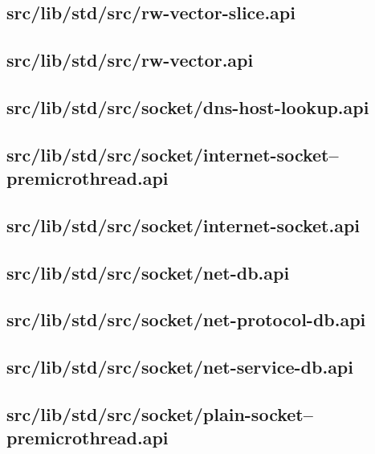 \subsection{src/lib/std/src/rw-vector-slice.api}


\subsection{src/lib/std/src/rw-vector.api}


\subsection{src/lib/std/src/socket/dns-host-lookup.api}


\subsection{src/lib/std/src/socket/internet-socket--premicrothread.api}


\subsection{src/lib/std/src/socket/internet-socket.api}


\subsection{src/lib/std/src/socket/net-db.api}


\subsection{src/lib/std/src/socket/net-protocol-db.api}


\subsection{src/lib/std/src/socket/net-service-db.api}


\subsection{src/lib/std/src/socket/plain-socket--premicrothread.api}


